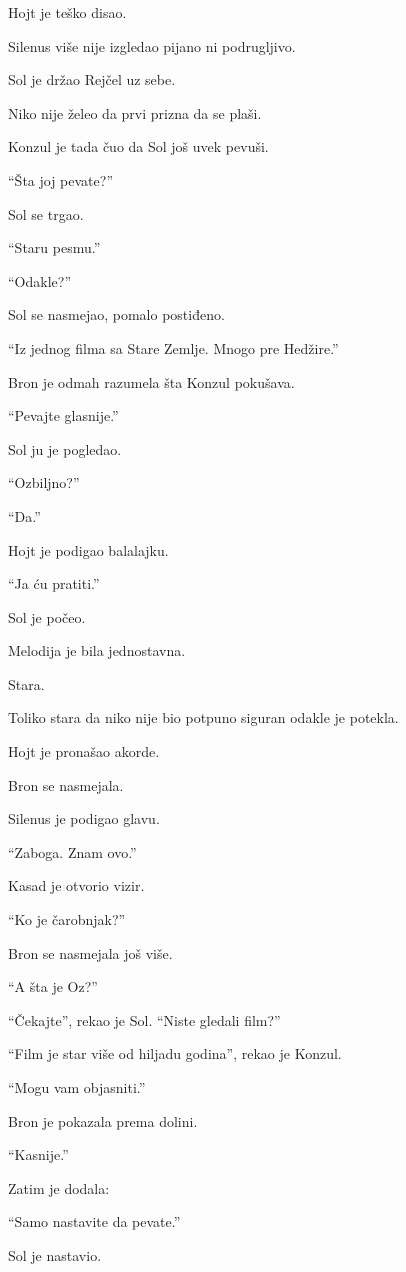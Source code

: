 Hojt je teško disao.

Silenus više nije izgledao pijano ni podrugljivo.

Sol je držao Rejčel uz sebe.

Niko nije želeo da prvi prizna da se plaši.

Konzul je tada čuo da Sol još uvek pevuši.

``Šta joj pevate?''

Sol se trgao.

``Staru pesmu.''

``Odakle?''

Sol se nasmejao, pomalo postiđeno.

``Iz jednog filma sa Stare Zemlje. Mnogo pre Hedžire.''

Bron je odmah razumela šta Konzul pokušava.

``Pevajte glasnije.''

Sol ju je pogledao.

``Ozbiljno?''

``Da.''

Hojt je podigao balalajku.

``Ja ću pratiti.''

\bigskip

Sol je počeo.

Melodija je bila jednostavna.

Stara.

Toliko stara da niko nije bio potpuno siguran odakle je potekla.

Hojt je pronašao akorde.

Bron se nasmejala.

Silenus je podigao glavu.

``Zaboga. Znam ovo.''

Kasad je otvorio vizir.

``Ko je čarobnjak?''

Bron se nasmejala još više.

``A šta je Oz?''

``Čekajte'', rekao je Sol. ``Niste gledali film?''

``Film je star više od hiljadu godina'', rekao je Konzul.

``Mogu vam objasniti.''

Bron je pokazala prema dolini.

``Kasnije.''

Zatim je dodala:

``Samo nastavite da pevate.''

Sol je nastavio.

